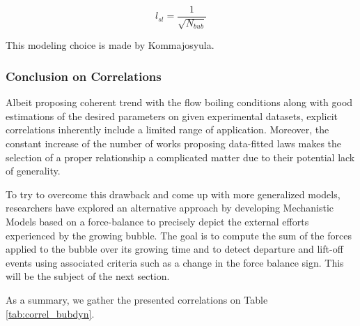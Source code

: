 \begin{equation}
l_{sl} = \frac{1}{\sqrt{N_{bub}}}
\label{eq:lsl_avgdist_bub}
\end{equation}

\begin{note*}{}
This modeling choice is made by Kommajosyula.
\end{note*}

\subsubsection{Conclusion on Correlations}

Albeit proposing coherent trend with the flow boiling conditions along with good estimations of the desired parameters on given experimental datasets, explicit correlations inherently include a limited range of application. Moreover, the constant increase of the number of works proposing data-fitted laws makes the selection of a proper relationship a complicated matter due to their potential lack of generality.

\npar

To try to overcome this drawback and come up with more generalized models, researchers have explored an alternative approach by developing Mechanistic Models based on a force-balance to precisely depict the external efforts experienced by the growing bubble. The goal is to compute the sum of the forces applied to the bubble over its growing time and to detect departure and lift-off events using associated criteria such as a change in the force balance sign. This will be the subject of the next section.

\npar

As a summary, we gather the presented correlations on Table \ref{tab:correl_bubdyn}.


